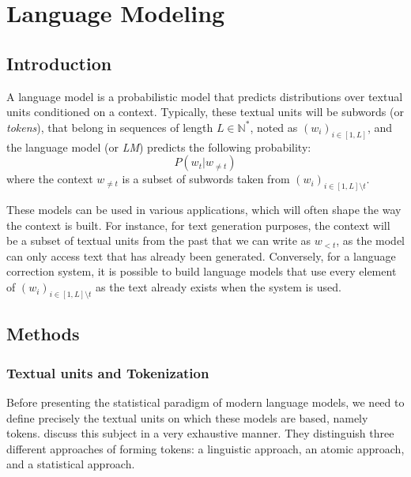 \chapter{Language Modeling}
\label{sec:rw_lm}


\section{Introduction}
A language model is a probabilistic model that predicts distributions over textual units conditioned on a context. Typically, these textual units will be subwords (or \textit{tokens}), that belong in sequences of length $L \in \mathbb{N}^*$, noted as $(w_i)_{i\in[1, L]}$, and the language model (or \textit{LM}) predicts the following probability:
$$
P(w_t | w_{\neq t})
$$
where the context $w_{\neq t}$ is a subset of subwords taken from $(w_i)_{i\in[1, L] \setminus t}$.

These models can be used in various applications, which will often shape the way the context is built. For instance, for text generation purposes, the context will be a subset of textual units from the past that we can write as $w_{< t}$, as the model can only access text that has already been generated. Conversely, for a language correction system, it is possible to build language models that use every element of $(w_i)_{i\in[1, L] \setminus t}$ as the text already exists when the system is used.


\section{Methods}

\subsection{Textual units and Tokenization}
\label{subsec:rw_lm_tokenization}

Before presenting the statistical paradigm of modern language models, we need to define precisely the textual units on which these models are based, namely tokens. \citet{mielke2021wordscharactersbriefhistory} discuss this subject in a very exhaustive manner. They distinguish three different approaches of forming tokens: a linguistic approach, an atomic approach, and a statistical approach.

